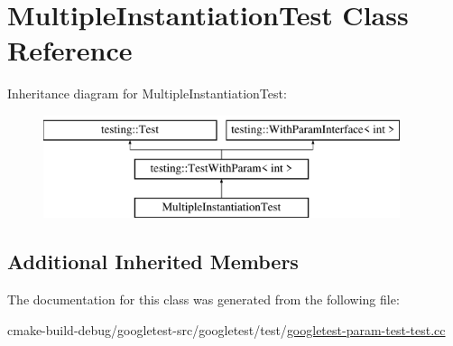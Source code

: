 \hypertarget{classMultipleInstantiationTest}{}\section{Multiple\+Instantiation\+Test Class Reference}
\label{classMultipleInstantiationTest}
Inheritance diagram for Multiple\+Instantiation\+Test\+:\begin{figure}[H]
\begin{center}
\leavevmode
\includegraphics[height=3.000000cm]{classMultipleInstantiationTest}
\end{center}
\end{figure}
\subsection*{Additional Inherited Members}


The documentation for this class was generated from the following file\+:\begin{DoxyCompactItemize}
\item 
cmake-\/build-\/debug/googletest-\/src/googletest/test/\mbox{\hyperlink{googletest-param-test-test_8cc}{googletest-\/param-\/test-\/test.\+cc}}\end{DoxyCompactItemize}
